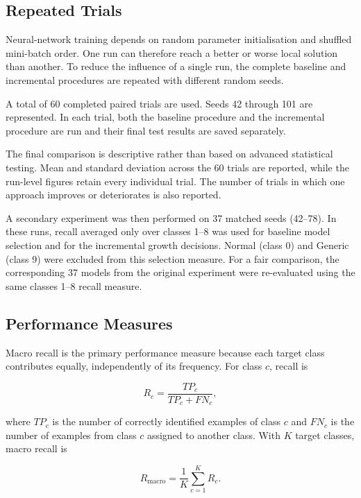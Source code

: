 \documentclass[conference]{IEEEtran}
\begin{document}
\subsection{Repeated Trials}

Neural-network training depends on random parameter initialisation and shuffled mini-batch order. One run can therefore reach a better or worse local solution than another. To reduce the influence of a single run, the complete baseline and incremental procedures are repeated with different random seeds.

A total of 60 completed paired trials are used. Seeds 42 through 101 are represented. In each trial, both the baseline procedure and the incremental procedure are run and their final test results are saved separately.

The final comparison is descriptive rather than based on advanced statistical testing. Mean and standard deviation across the 60 trials are reported, while the run-level figures retain every individual trial. The number of trials in which one approach improves or deteriorates is also reported.

A secondary experiment was then performed on 37 matched seeds (42--78). In these runs, recall averaged only over classes 1--8 was used for baseline model selection and for the incremental growth decisions. Normal (class 0) and Generic (class 9) were excluded from this selection measure. For a fair comparison, the corresponding 37 models from the original experiment were re-evaluated using the same classes 1--8 recall measure.

\subsection{Performance Measures}

Macro recall is the primary performance measure because each target class contributes equally, independently of its frequency. For class $c$, recall is

\begin{equation}
R_c = \frac{TP_c}{TP_c + FN_c},
\end{equation}

where $TP_c$ is the number of correctly identified examples of class $c$ and $FN_c$ is the number of examples from class $c$ assigned to another class. With $K$ target classes, macro recall is

\begin{equation}
R_{\mathrm{macro}} = \frac{1}{K}\sum_{c=1}^{K} R_c.
\end{equation}
\end{document}
